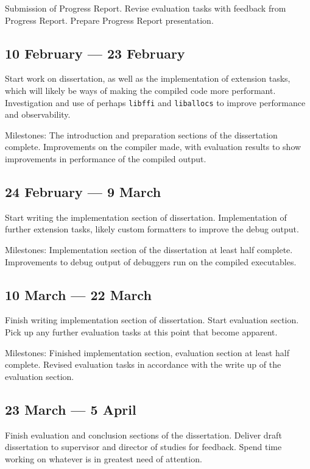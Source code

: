 Submission of Progress Report. Revise evaluation tasks with feedback from
Progress Report. Prepare Progress Report presentation.

\subsection*{10 February --- 23 February}

Start work on dissertation, as well as the implementation of extension tasks,
which will likely be ways of making the compiled code more performant.
Investigation and use of perhaps \texttt{libffi} and \texttt{liballocs} to
improve performance and observability.

Milestones: The introduction and preparation sections of the dissertation
complete. Improvements on the compiler made, with evaluation results to show
improvements in performance of the compiled output.

\subsection*{24 February --- 9 March}

Start writing the implementation section of dissertation. Implementation of
further extension tasks, likely custom formatters to improve the debug output.

Milestones: Implementation section of the dissertation at least half complete.
Improvements to debug output of debuggers run on the compiled executables.

\subsection*{10 March --- 22 March}

Finish writing implementation section of dissertation. Start evaluation
section. Pick up any further evaluation tasks at this point that become
apparent.

Milestones: Finished implementation section, evaluation section at least half
complete. Revised evaluation tasks in accordance with the write up of the
evaluation section.

\subsection*{23 March --- 5 April}

Finish evaluation and conclusion sections of the dissertation. Deliver draft
dissertation to supervisor and director of studies for feedback. Spend time
working on whatever is in greatest need of attention.

